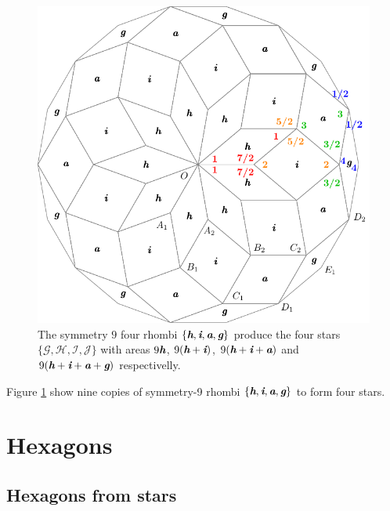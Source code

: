 \documentclass[11pt]{article}
\def\mathbi#1{\textbf{\em #1}}
\begin{document}
\begin{figure}[H]
\centering
\includegraphics[scale=1]{rhombi-9}
\caption{The symmetry $9$ four rhombi $\{\mathbi{h},\mathbi{i},\mathbi{a},\mathbi{g}\}$ produce the four stars $\{\mathcal{G},\mathcal{H},\mathcal{I},\mathcal{J}\}$ with areas
$9\mathbi{h}$,
 $9(\mathbi{h}+\mathbi{i})$,
 $9(\mathbi{h}+\mathbi{i}+\mathbi{a})$ and 
 $9(\mathbi{h}+\mathbi{i}+\mathbi{a}+\mathbi{g})$ respectivelly.}
\label{fig:rhombi-9}
\end{figure}

Figure \ref{fig:rhombi-9} show nine copies of symmetry-9 rhombi $\{\mathbi{h},\mathbi{i},\mathbi{a},\mathbi{g}\}$ to form four stars.




\section{Hexagons}

\subsection{Hexagons from stars}
\end{document}
